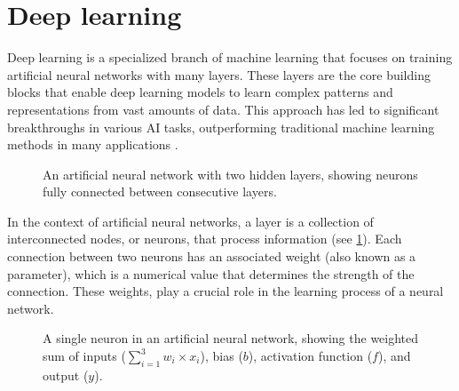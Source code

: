 \section{Deep learning}
Deep learning is a specialized branch of machine learning that focuses on training artificial neural networks with many layers.
These layers are the core building blocks that enable deep learning models to learn complex patterns and representations from vast amounts of data.
This approach has led to significant breakthroughs in various AI tasks, outperforming traditional machine learning methods in many applications \cite{lecunDeepLearning2015}.

\begin{figure}[hbtp]
    \centering    
    
    \caption{An artificial neural network with two hidden layers, showing neurons fully connected between consecutive layers.}
    \label{fig:ann}
\end{figure}

In the context of artificial neural networks, a layer is a collection of interconnected nodes, or neurons, that process information (see \cref{fig:ann}).
Each connection between two neurons has an associated weight (also known as a parameter), which is a numerical value that determines the strength of the connection.
These weights, play a crucial role in the learning process of a neural network.

\begin{figure}[hbtp]
    \centering    
    
    \caption{
        A single neuron in an artificial neural network, showing the weighted sum of inputs ($\sum_{i=1}^{3}{w_i \times x_i}$), bias ($b$), activation function ($f$), and output ($y$).
    }
    \label{fig:neuron}
\end{figure}


